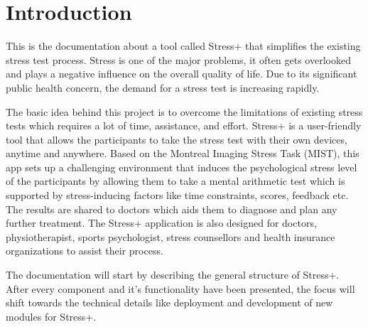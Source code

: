 \section{Introduction}
\label{sec:introduction}

This is the documentation about a tool called Stress+ that simplifies the existing stress test process. 
Stress is one of the major problems, it often gets overlooked and plays a negative influence on the overall quality of life. 
Due to its significant public health concern, the demand for a stress test is increasing rapidly. 

The basic idea behind this project is to overcome the limitations of existing stress tests which requires a lot of time, assistance, and effort. 
Stress+ is a user-friendly tool that allows the participants to take the stress test with their own devices, anytime and anywhere. 
Based on the Montreal Imaging Stress Task (MIST), this app sets up a challenging environment that induces the psychological stress level of the participants by allowing them to take a mental arithmetic test which is supported by stress-inducing factors like time constraints, scores, feedback etc. 
The results are shared to doctors which aids them to diagnose and plan any further treatment.
The Stress+ application is also designed for doctors, physiotherapist, sports psychologist, stress counsellors and health insurance organizations to assist their process.

The documentation will start by describing the general structure of Stress+.
After every component and it's functionality have been presented, the focus will shift towards the technical details like deployment and development of new modules for Stress+.
